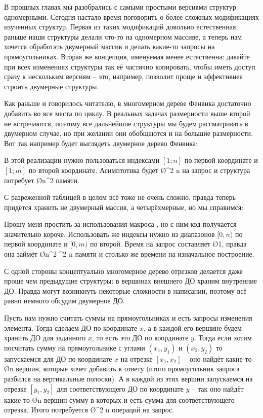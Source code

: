 В прошлых главах мы разобрались с самыми простыми версиями структур: одномерными. Сегодня настало время поговорить о более сложных модификациях изученных структур. Первая из таких модификаций довольно естественная: раньше наши структуры делали что-то на одномерном массиве, а теперь нам хочется обработать двумерный массив и делать какие-то запросы на прямоугольниках. Вторая же концепция, именуемая  менее естественна: давайте при всех изменениях структуры так её частично копировать, чтобы иметь доступ сразу к нескольким версиям -- это, например, позволит проще и эффективнее строить двумерные структуры.


Как раньше и говорилось читателю, в многомерном дереве Фенвика достаточно добавить во все места по циклу. В реальных задачах размерности выше второй не встречаются, поэтому все дальнейшие структуры мы будем рассматривать в двумерном случае, но при желании они обобщаются и на большие размерности. Вот так например будет выглядеть двумерное дерево Фенвика:

\nocode

В этой реализации нужно пользоваться индексами $[1; n]$ по первой координате и $[1; m]$ по второй координате. Асимптотика будет \O{\log^2 n} на запрос и структура потребует \O{n^2} памяти.


С разреженной таблицей в целом всё тоже не очень сложно, правда теперь придётся хранить не двумерный массив, а четырёхмерные, но мы справимся:

\nocode

Прошу меня простить за использования макроса , но с ним код получается значительно короче. Использовать же индексы нужно из диапазонов $[0, n)$ по первой координате и $[0, m)$ по второй. Время на запрос составляет \O{1}, правда она займёт \O{n^2 \log^2 n} памяти и столько же времени на изначальное построение.


С одной стороны концептуально многомерное дерево отрезков делается даже проще чем предыдущие структуры: в вершинах внешнего ДО храним внутренние ДО. Правда могут возникнуть некоторые сложности в написании, поэтому всё равно немного обсудим двумерное ДО.

Пусть нам нужно считать суммы на прямоугольниках и есть запросы изменения элемента. Тогда сделаем ДО по координате $x$, а в каждой его вершине будем хранить ДО для заданного $x$, то есть это ДО по координате $y$. Тогда если хотим посчитать сумму на прямоугольнике с углами $(x_1, y_1)$ и $(x_2, y_2)$ то запускаемся для ДО по координате $x$ на отрезке $[x_1, x_2]$ -- оно найдёт какие-то \O{\log n} вершин, которые хочет добавить к ответу (итого прямоугольник запроса разбился на вертикальные полоски). А в каждой из этих вершин запускаемся на отрезке $[y_1, y_2]$ для соответствующего ДО по координате $y$ -- так оно найдёт какие-то \O{\log n} вершин сумму в которых и есть сумма для соответствующего отрезка. Итого потребуется \O{\log^2 n} операций на запрос.

